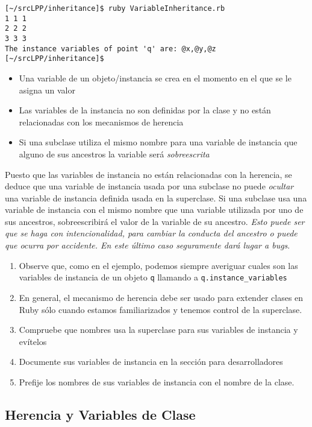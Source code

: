 \begin{verbatim}
[~/srcLPP/inheritance]$ ruby VariableInheritance.rb 
1 1 1
2 2 2
3 3 3
The instance variables of point 'q' are: @x,@y,@z
[~/srcLPP/inheritance]$ 
\end{verbatim}

\begin{itemize}

\item Una variable de un objeto/instancia
se crea en el momento en el que se le asigna
un valor
\item Las variables de la instancia no son definidas por la clase
y no están relacionadas con los mecanismos de herencia
\item Si una subclase utiliza el mismo  nombre 
para una variable de instancia que alguno de sus ancestros la variable
será \emph{sobreescrita}
\end{itemize}

Puesto que las variables de instancia no están relacionadas con la
herencia, se deduce que una variable de instancia usada por una
subclase no puede
\emph{ocultar} una variable de instancia definida usada en la superclase.
Si una subclase usa una variable de instancia con el mismo nombre que una variable utilizada por uno de sus
ancestros, sobreescribirá el valor de la variable de su ancestro.
\emph{Esto puede ser que se haga con intencionalidad, para cambiar la conducta del ancestro
o puede que ocurra por accidente. En este último caso seguramente dará lugar a bugs}.


\begin{enumerate}
\item Observe que, como en el ejemplo, 
podemos siempre averiguar cuales son las variables de instancia
de un objeto \verb|q| llamando a \verb|q.instance_variables|
\item
En general, el mecanismo de herencia debe ser usado para extender clases en Ruby
sólo cuando estamos familiarizados y tenemos control de la superclase.
\item Compruebe que nombres usa la superclase para sus variables de instancia y evítelos
\item Documente sus variables de instancia en la sección para desarrolladores
\item Prefije los nombres de sus variables de instancia con el nombre de la clase. 
\end{enumerate}

\subsection{Herencia y Variables de Clase}

